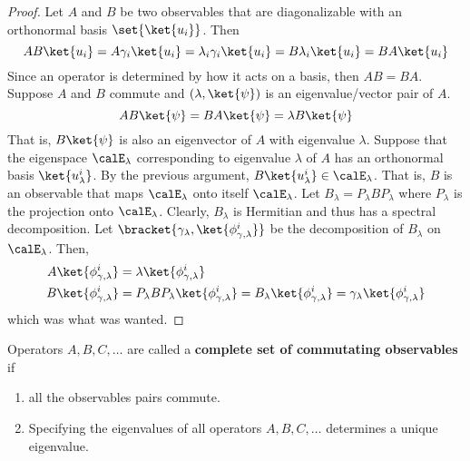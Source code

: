 \begin{proof}
    Let \(A\) and \(B\) be two observables that are diagonalizable with an orthonormal basis \(\set{\ket{u_i}}\). Then
    \begin{equation*}
        AB \ket{u_i} = A \gamma_i \ket{u_i} = \lambda_i \gamma_{i}\ket{u_i} = B \lambda_i \ket{u_i} = BA \ket{u_i}
    \end{equation*}
    Since an operator is determined by how it acts on a basis, then \(AB= BA\). Suppose \(A\) and \(B\) commute and \((\lambda,\ket{\psi})\) is an eigenvalue/vector pair of \(A\).
    \begin{equation*}
        AB \ket{\psi} = BA \ket{\psi} = \lambda B \ket{\psi}
    \end{equation*}
    That is, \(B \ket{\psi}\) is also an eigenvector of \(A\) with eigenvalue \(\lambda\). Suppose that the eigenspace \(\calE_{\lambda}\) corresponding to eigenvalue \(\lambda\) of \(A\) has an orthonormal basis \(\ket{u_{\lambda}^i}\). By the previous argument, \(B \ket{u_{\lambda}^i} \in \calE_{\lambda}\). That is, \(B\) is an observable that maps \(\calE_{\lambda}\) onto itself \(\calE_{\lambda}\). Let \(B_{\lambda} = P_{\lambda} B P_{\lambda}\) where \(P_{\lambda}\) is the projection onto \(\calE_{\lambda}\). Clearly, \(B_{\lambda}\) is Hermitian and thus has a spectral decomposition. Let \(\bracket{\gamma_{\lambda}, \ket{\phi_{\gamma,\lambda}^i}}\) be the decomposition of \(B_{\lambda}\) on \(\calE_{\lambda}\). Then,
    \begin{align*}
        A  \ket{\phi_{\gamma,\lambda}^i} & = \lambda \ket{\phi_{\gamma,\lambda}^i}                                                                                                                  \\
        B  \ket{\phi_{\gamma,\lambda}^i} & = P_{\lambda} B P_{\lambda}  \ket{\phi_{\gamma,\lambda}^i} = B_{\lambda} \ket{\phi_{\gamma,\lambda}^i} = \gamma_{\lambda}  \ket{\phi_{\gamma,\lambda}^i}
    \end{align*}
    which was what was wanted.
\end{proof}

\begin{definition}
    Operators \(A,B,C, \dots\) are called a \textbf{complete set of commutating observables} if
    \begin{enumerate}
        \item all the observables pairs commute.
        \item Specifying the eigenvalues of all operators \(A,B,C, \dots\) determines a unique eigenvalue.
    \end{enumerate}
\end{definition}

